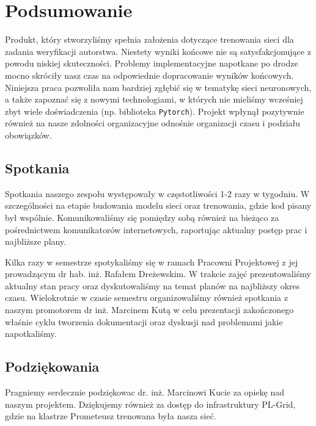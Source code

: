 \newpage
\section{Podsumowanie}

Produkt, który stworzyliśmy spełnia założenia dotyczące trenowania sieci dla zadania weryfikacji autorstwa.
Niestety wyniki końcowe nie są satysfakcjonujące z powodu niskiej skuteczności. Problemy implementacyjne 
napotkane po drodze mocno skróciły nasz czas na odpowiednie dopracowanie wyników końcowych.
\newline
\newline
Niniejsza praca pozwoliła nam bardziej zgłębić się w tematykę sieci neuronowych, 
a także zapoznać się z nowymi technologiami, w których nie mieliśmy wcześniej zbyt wiele doświadczenia
(np. biblioteka \texttt{Pytorch}). Projekt wpłynął pozytywnie również na nasze zdolności organizacyjne
odnośnie organizacji czasu i podziału obowiązków.

\subsection{Spotkania}
Spotkania naszego zespołu występowały w częstotliwości 1-2 razy w tygodniu. W szczególności na etapie
budowania modelu sieci oraz trenowania, gdzie kod pisany był wspólnie.
Komunikowaliśmy się pomiędzy sobą również na bieżąco za pośrednictwem komunikatorów internetowych, 
raportując aktualny postęp prac i najbliższe plany.

Kilka razy w semestrze spotykaliśmy się w ramach Pracowni Projektowej z jej prowadzącym dr hab. inż. Rafałem Dreżewskim.
W trakcie zajęć prezentowaliśmy aktualny stan pracy oraz dyskutowaliśmy na temat planów na najbliższy okres czasu.
\newline
\newline
Wielokrotnie w czasie semestru organizowaliśmy również spotkania z naszym promotorem dr inż. Marcinem Kutą 
w celu prezentacji zakończonego właśnie cyklu tworzenia dokumentacji oraz dyskusji nad problemami jakie napotkaliśmy.

\subsection{Podziękowania}
Pragniemy serdecznie podziękowac dr. inż. Marcinowi Kucie za opiekę nad naszym projektem.
Dziękujemy również za dostęp do infrastruktury PL-Grid, gdzie na klastrze Prometeusz trenowana była
nasza sieć.